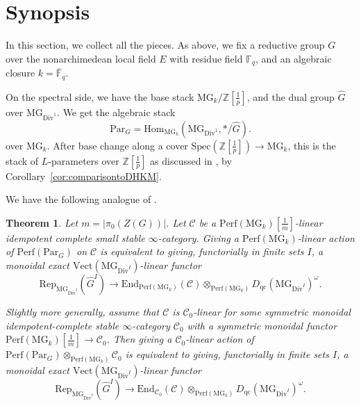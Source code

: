 \documentclass[11pt]{amsart}
\numberwithin{equation}{section}
\newtheorem{theorem}{Theorem}
\numberwithin{theorem}{section}
\theoremstyle{definition}
\begin{document}
\section{Synopsis}

In this section, we collect all the pieces. As above, we fix a reductive group $G$ over the nonarchimedean local field $E$ with residue field $\mathbb F_q$, and an algebraic closure $k=\overline{\mathbb F}_q$.

On the spectral side, we have the base stack $\mathrm{MG}_k/\mathbb Z[\tfrac 1p]$, and the dual group $\widehat{G}$ over $\mathrm{MG}_{\mathrm{Div}^1}$. We get the algebraic stack
\[
\mathrm{Par}_G = \mathrm{Hom}_{\mathrm{MG}_k}(\mathrm{MG}_{\mathrm{Div}^1},\ast/\widehat{G}).
\]
over $\mathrm{MG}_k$. After base change along a cover $\mathrm{Spec}(\mathbb Z[\tfrac 1p])\to \mathrm{MG}_k$, this is the stack of $L$-parameters over $\mathbb Z[\tfrac 1p]$ as discussed in \cite{DHKM}, by Corollary~\ref{cor:comparisontoDHKM}.

We have the following analogue of \cite[Theorem X.0.2]{FarguesScholze}.

\begin{theorem}\label{thm:constructspectralaction} Let $m=|\pi_0(Z(G))|$. Let $\mathcal C$ be a $\mathrm{Perf}(\mathrm{MG}_k)[\frac 1m]$-linear idempotent complete small stable $\infty$-category. Giving a $\mathrm{Perf}(\mathrm{MG}_k)$-linear action of $\mathrm{Perf}(\mathrm{Par}_G)$ on $\mathcal C$ is equivalent to giving, functorially in finite sets $I$, a monoidal exact $\mathrm{Vect}(\mathrm{MG}_{\mathrm{Div}^I})$-linear functor
\[
\mathrm{Rep}_{\mathrm{MG}_{\mathrm{Div}^I}}(\widehat{G}^I)\to \mathrm{End}_{\mathrm{Perf}(\mathrm{MG}_k)}(\mathcal C)\otimes_{\mathrm{Perf}(\mathrm{MG}_k)} D_{\mathrm{qc}}(\mathrm{MG}_{\mathrm{Div}^I})^\omega.
\]

Slightly more generally, assume that $\mathcal C$ is $\mathcal C_0$-linear for some symmetric monoidal idempotent-complete stable $\infty$-category $\mathcal C_0$ with a symmetric monoidal functor $\mathrm{Perf}(\mathrm{MG}_k)[\tfrac 1m]\to \mathcal C_0$. Then giving a $\mathcal C_0$-linear action of $\mathrm{Perf}(\mathrm{Par}_G)\otimes_{\mathrm{Perf}(\mathrm{MG}_k)} \mathcal C_0$ is equivalent to giving, functorially in finite sets $I$, a monoidal exact $\mathrm{Vect}(\mathrm{MG}_{\mathrm{Div}^I})$-linear functor
\[
\mathrm{Rep}_{\mathrm{MG}_{\mathrm{Div}^I}}(\widehat{G}^I)\to \mathrm{End}_{\mathcal C_0}(\mathcal C)\otimes_{\mathrm{Perf}(\mathrm{MG}_k)} D_{\mathrm{qc}}(\mathrm{MG}_{\mathrm{Div}^I})^\omega.
\]
\end{theorem}
\end{document}
